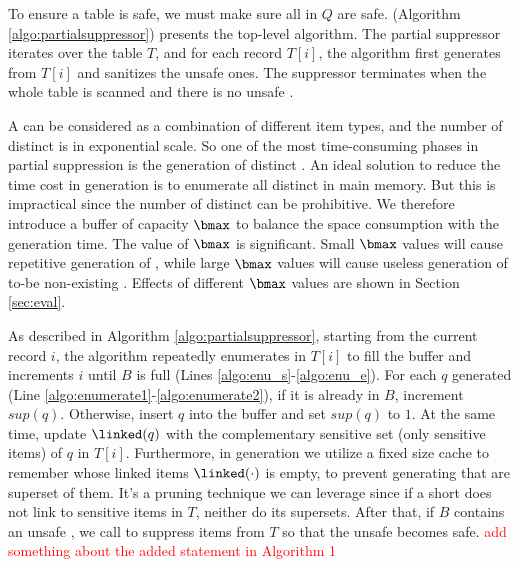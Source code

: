 To ensure a table is safe, we must make sure all \qids in $Q$ are safe.
\PartialSuppressor (Algorithm \ref{algo:partialsuppressor}) presents the
top-level algorithm. The partial suppressor iterates over the table $T$, and
for each record $T[i]$, the algorithm first generates  \qids from $T[i]$ and
sanitizes the unsafe ones. The suppressor terminates when the whole table is
scanned and there is no unsafe \qid.

A \qid can be considered as a combination of different item types,
  and the number of distinct \qids is in exponential scale.
So one of the most time-consuming phases in partial suppression is
  the generation of distinct \qids.
An ideal solution to reduce the time cost in \qid generation is to enumerate
all distinct \qids in main memory. But this is impractical since the number
of distinct \qids can be prohibitive. We therefore introduce a \qid buffer of
capacity $\bmax$ to balance the space consumption with the generation time.
The value of $\bmax$ is significant. Small $\bmax$ values will cause
repetitive generation of \qids, while large $\bmax$ values will cause useless
generation of to-be non-existing \qids. Effects of different $\bmax$ values are
shown in Section \ref{sec:eval}.

As described in Algorithm \ref{algo:partialsuppressor}, starting from the
current record $i$, the algorithm repeatedly enumerates \qids in $T[i]$ to
fill the buffer and increments $i$ until $B$ is full (Lines
\ref{algo:enu_s}-\ref{algo:enu_e}).
For each $q$ generated (Line \ref{algo:enumerate1}-\ref{algo:enumerate2}), if
it is already in $B$, increment $sup(q)$. Otherwise, insert $q$ into the
buffer and set $sup(q)$ to $1$. At the same time, update $\linked(q)$ with
the complementary sensitive set (only sensitive items) of $q$ in $T[i]$.
Furthermore, in \qid generation we utilize a fixed size cache to remember \qids
whose linked items $\linked(\cdot)$ is empty, to prevent generating \qids that
are superset of them. It's a pruning technique we can leverage
 since if a short \qid does not link to sensitive items in $T$, neither do its supersets.
After that, if $B$ contains an unsafe \qid, we call \SanitizeBuffer to
suppress items from $T$ so that the unsafe \qid becomes safe.
\textcolor{red}{add something about the added statement in Algorithm 1}

